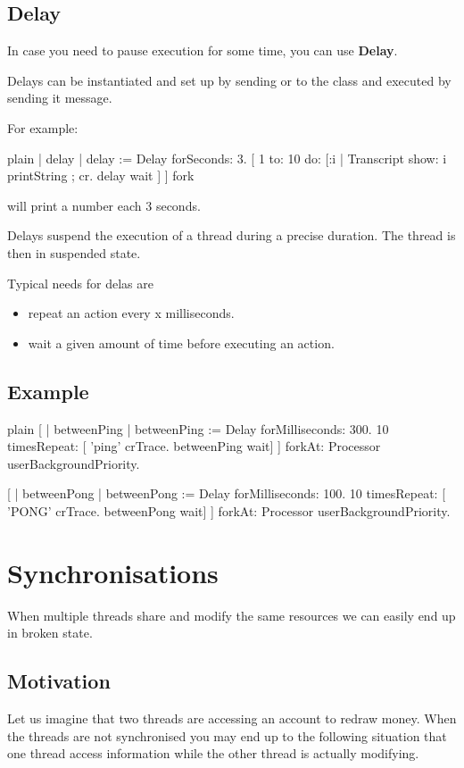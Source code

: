 \documentclass[10pt,twoside,english]{_support/latex/sbabook/sbabook}
\begin{document}
\section{Delay}
In case you need to pause execution for some time, you can use \textbf{Delay}.

Delays can be instantiated and set up by sending  or  to the class  and executed by sending it  message.

For example:

\begin{displaycode}{plain}
| delay |
delay := Delay forSeconds: 3.
[ 1 to: 10 do: [:i |
  Transcript show: i printString ; cr.
  delay wait ] ] fork
\end{displaycode}

will print a number each 3 seconds.

Delays suspend the execution of a thread during a precise duration. The thread is then in suspended state.

Typical needs for delas are 

\begin{itemize}
\item repeat an action every x milliseconds.
\item wait a given amount of time before executing an action. 
\end{itemize}
\section{Example}
\begin{displaycode}{plain}
[
| betweenPing |  
betweenPing := Delay forMilliseconds: 300.
10 timesRepeat: [ 
   'ping' crTrace. 
   betweenPing wait] 
   ] forkAt: Processor userBackgroundPriority.
	  
[
| betweenPong |  
betweenPong := Delay forMilliseconds: 100.
10 timesRepeat: [ 
   'PONG' crTrace. 
   betweenPong wait]
   ] forkAt: Processor userBackgroundPriority.
\end{displaycode}
\chapter{Synchronisations}
When multiple threads share and modify the same resources we can easily end up in 
broken state. 
\section{Motivation}
Let us imagine that two threads are accessing an account to redraw money.
When the threads are not synchronised you may end up to the following situation
that one thread access information while the other thread is actually modifying. 
\end{document}
